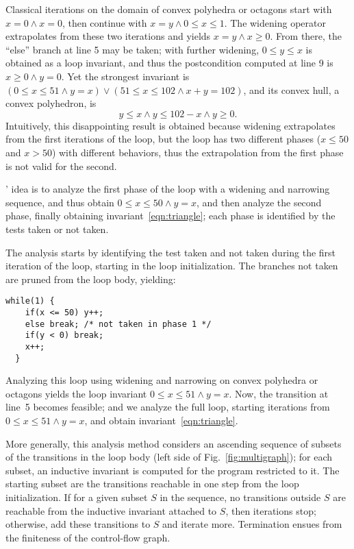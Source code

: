 \documentclass[preprint]{sigplanconf}
\begin{document}
Classical iterations on the domain of convex polyhedra \cite{Halbwachs_PhD,CousotHalbwachs78} or octagons \cite{Mine_PhD,DBLP:journals/lisp/Mine06} start with $x = 0 \land x = 0$, then continue with $x = y \land 0 \leq x \leq 1$.
The widening operator extrapolates from these two iterations and yields $x = y \land x \geq 0$.
From there, the ``else'' branch at line 5 may be taken; with further widening, $0 \leq y \leq x$ is obtained as a loop invariant, and thus the postcondition computed at line 9 is $x \geq 0 \land y = 0$.
Yet the strongest invariant is $(0 \leq x \leq 51 \land y = x) \lor (51 \leq x \leq 102 \land x+y=102)$, and its convex hull, a convex polyhedron, is
\begin{equation}
y \leq x \land y \leq 102-x \land y \geq 0.\label{eqn:triangle}
\end{equation} %
Intuitively, this disappointing result is obtained because widening extrapolates from the first iterations of the loop, but the loop has two different phases ($x \leq 50$ and $x > 50$) with different behaviors, thus the extrapolation from the first phase is not valid for the second.

\citeauthor{DBLP:conf/sas/GopanR07}' idea is to analyze the first phase of the loop with a widening and narrowing sequence, and thus obtain $0 \leq x \leq 50 \land y = x$, and then analyze the second phase, finally obtaining invariant~\ref{eqn:triangle}; each phase is identified by the tests taken or not taken.

The analysis starts by identifying the test taken and not taken during the first iteration of the loop, starting in the loop initialization. The branches not taken are pruned from the loop body, yielding:
\begin{lstlisting}[numbers=none]
  while(1) {
    if(x <= 50) y++;
    else break; /* not taken in phase 1 */
    if(y < 0) break;
    x++;
  }
\end{lstlisting}

Analyzing this loop using widening and narrowing on convex polyhedra or octagons yields the loop invariant $0 \leq x \leq 51 \land y = x$. Now, the transition at line~5 becomes feasible; and we analyze the full loop, starting iterations from $0 \leq x \leq 51 \land y = x$, and obtain invariant~\ref{eqn:triangle}.

More generally, this analysis method considers an ascending sequence of subsets of the transitions in the loop body (left side of Fig.~\ref{fig:multigraph});
for each subset, an inductive invariant is computed for the program restricted to it.
The starting subset are the transitions reachable in one step from the loop initialization.
If for a given subset $S$ in the sequence, no transitions outside $S$ are reachable from the inductive invariant attached to $S$, then iterations stop;
otherwise, add these transitions to $S$ and iterate more.
Termination ensues from the finiteness of the control-flow graph.
\end{document}
